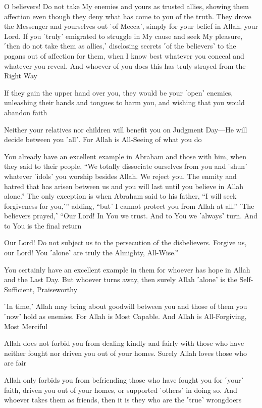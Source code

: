 O believers! Do not take My enemies and yours as trusted allies, showing them affection even though they deny what has come to you of the truth. They drove the Messenger and yourselves out ˹of Mecca˺, simply for your belief in Allah, your Lord. If you ˹truly˺ emigrated to struggle in My cause and seek My pleasure, ˹then do not take them as allies,˺ disclosing secrets ˹of the believers˺ to the pagans out of affection for them, when I know best whatever you conceal and whatever you reveal. And whoever of you does this has truly strayed from the Right Way

If they gain the upper hand over you, they would be your ˹open˺ enemies, unleashing their hands and tongues to harm you, and wishing that you would abandon faith

Neither your relatives nor children will benefit you on Judgment Day—He will decide between you ˹all˺. For Allah is All-Seeing of what you do

You already have an excellent example in Abraham and those with him, when they said to their people, “We totally dissociate ourselves from you and ˹shun˺ whatever ˹idols˺ you worship besides Allah. We reject you. The enmity and hatred that has arisen between us and you will last until you believe in Allah alone.” The only exception is when Abraham said to his father, “I will seek forgiveness for you,˹” adding, “but˺ I cannot protect you from Allah at all.” ˹The believers prayed,˺ “Our Lord! In You we trust. And to You we ˹always˺ turn. And to You is the final return

Our Lord! Do not subject us to the persecution of the disbelievers. Forgive us, our Lord! You ˹alone˺ are truly the Almighty, All-Wise.”

You certainly have an excellent example in them for whoever has hope in Allah and the Last Day. But whoever turns away, then surely Allah ˹alone˺ is the Self-Sufficient, Praiseworthy

˹In time,˺ Allah may bring about goodwill between you and those of them you ˹now˺ hold as enemies. For Allah is Most Capable. And Allah is All-Forgiving, Most Merciful

Allah does not forbid you from dealing kindly and fairly with those who have neither fought nor driven you out of your homes. Surely Allah loves those who are fair

Allah only forbids you from befriending those who have fought you for ˹your˺ faith, driven you out of your homes, or supported ˹others˺ in doing so. And whoever takes them as friends, then it is they who are the ˹true˺ wrongdoers

